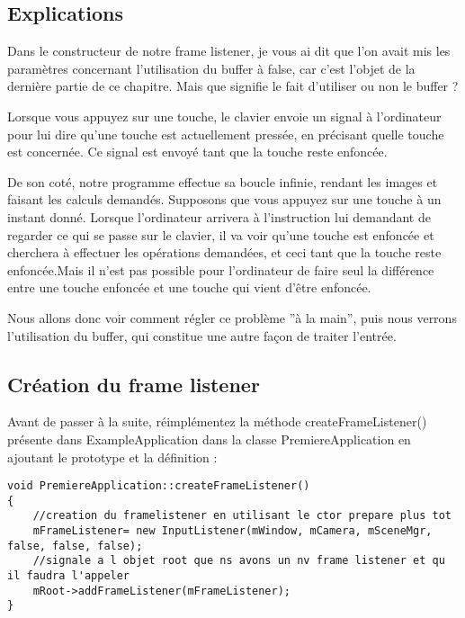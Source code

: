 \documentclass[10pt,a4paper]{report}
\begin{document}
\subsection{Explications}
Dans le constructeur de notre frame listener, je vous ai dit que l'on avait mis les param\`etres concernant l'utilisation du buffer \`a false, car c'est l'objet de la derni\`ere partie de ce chapitre. Mais que signifie le fait d'utiliser ou non le buffer ?

Lorsque vous appuyez sur une touche, le clavier envoie un signal \`a l'ordinateur pour lui dire qu'une touche est actuellement press\'ee, en pr\'ecisant quelle touche est concern\'ee. Ce signal est envoy\'e tant que la touche reste enfonc\'ee.

De son cot\'e, notre programme effectue sa boucle infinie, rendant les images et faisant les calculs demand\'es. Supposons que vous appuyez sur une touche \`a un instant donn\'e. Lorsque l'ordinateur arrivera \`a l'instruction lui demandant de regarder ce qui se passe sur le clavier, il va voir qu'une touche est enfonc\'ee et cherchera \`a effectuer les op\'erations demand\'ees, et ceci tant que la touche reste enfonc\'ee.Mais il n'est pas possible pour l'ordinateur de faire seul la diff\'erence entre une touche enfonc\'ee et une touche qui vient d'\^etre enfonc\'ee.

Nous allons donc voir comment r\'egler ce probl\`eme ''\`a la main'', puis nous verrons l'utilisation du buffer, qui constitue une autre fa\c{c}on de traiter l'entr\'ee.

\subsection{Cr\'eation du frame listener}

Avant de passer \`a la suite, r\'eimpl\'ementez la m\'ethode createFrameListener() pr\'esente dans ExampleApplication dans la classe PremiereApplication en ajoutant le prototype et la d\'efinition :

\begin{lstlisting}[caption={InputListener.cpp}]
void PremiereApplication::createFrameListener()
{
    //creation du framelistener en utilisant le ctor prepare plus tot
    mFrameListener= new InputListener(mWindow, mCamera, mSceneMgr, false, false, false);
    //signale a l objet root que ns avons un nv frame listener et qu il faudra l'appeler
    mRoot->addFrameListener(mFrameListener);
}
\end{lstlisting}
\end{document}
